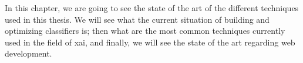 In this chapter, we are going to see the state of the art of the different techniques used in this thesis. We will see what the current situation of building and optimizing classifiers is; then what are the most common techniques currently used in the field of \ac{xai}, and finally, we will see the state of the art regarding web development.